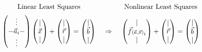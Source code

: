\documentclass[12pt]{article}
\begin{document}
\vspace{10pt}
\[
    \arraycolsep=2pt \begin{array}{c c c}
        \text{Linear Least Squares} 
            &
            &\text{Nonlinear Least Squares}
            \\[5pt] 
        \left(\begin{matrix}
                \vdots\\
                - \vec{a}_i -\\
                \vdots
            \end{matrix}\right)
            \left(\begin{matrix}
                |\\
                \vec{x}\\
                |
            \end{matrix}\right)
            +
            \left(\begin{matrix}
                |\\
                \vec{r}\\
                |
            \end{matrix}\right) 
            =
            \left(\begin{matrix}
                |\\
                \vec{b}\\
                |
            \end{matrix}\right) 
            &\ \ \ \Rightarrow \ \ \
            &\left(\begin{matrix}
                    |\\
                    \vec{f}{\scriptstyle (\vec{a}, \vec{x}) }_i\\
                    |
                \end{matrix}\right)
                +
                \left(\begin{matrix}
                    |\\
                    \vec{r}\\
                    |
                \end{matrix}\right) 
                =
                \left(\begin{matrix}
                    |\\
                    \vec{b}\\
                    |
                \end{matrix}\right) 
    \end{array}
\]
\end{document}
